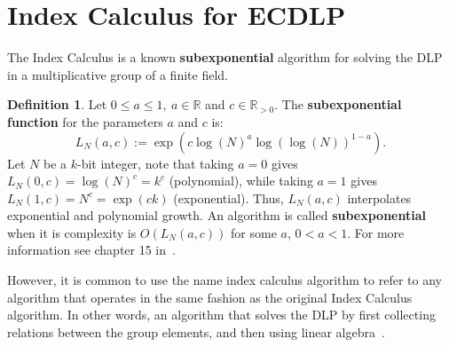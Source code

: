 \documentclass[thesis=M,english]{FITthesis}[2012/10/20]
\theoremstyle{remark}
\theoremstyle{definition}
\newtheorem{DF}{Definition}[section]
\begin{document}
\section{Index Calculus for ECDLP}
The Index Calculus is a known \textbf{subexponential} algorithm for solving the DLP in a multiplicative group of a finite field. 
\begin{DF}
Let $0\leq a \leq 1,\ a \in \mathbb{R}$ and $c \in \mathbb{R}_{>0}$. The \textbf{subexponential function} for the parameters $a$ and $c$ is:
$$
L_N(a,c) := \exp(c\log(N)^a \log(\log(N))^{1-a}).
$$
Let $N$ be a $k$-bit integer, note that taking $a=0$ gives $L_N(0,c) = \log(N)^c = k^c$ (polynomial), while taking $a=1$ gives $L_N(1,c) = N^c = \exp(ck)$ (exponential). Thus, $L_N(a,c)$ interpolates exponential and polynomial growth. An algorithm is called \textbf{subexponential} when it is complexity is $O(L_N(a,c))$ for some $a$, $0 < a < 1$. For more information see chapter 15 in~\cite{subExp}.
\end{DF} 
\noindent However, it is common to use the name index calculus algorithm to refer to any algorithm that operates in the same fashion as the original Index Calculus algorithm. In other words, an algorithm that solves the DLP by first collecting relations between the group elements, and then using linear algebra~\cite{amadori17}.
\end{document}
